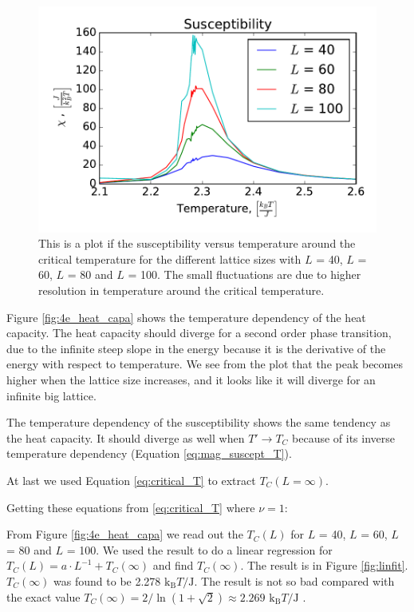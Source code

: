 \begin{figure}[H]
\includegraphics[width=\linewidth]{../results/4e/4e_x}\caption{This is a plot if the susceptibility versus temperature around the critical temperature for the different lattice sizes with $L$ = 40, $L$ = 60, $L$ = 80 and $L$ = 100. The small fluctuations are due to higher resolution in temperature around the critical temperature.}\label{fig:4e_suscept}
\end{figure}

Figure \ref{fig:4e_heat_capa} shows the temperature dependency of the heat capacity. The heat capacity should diverge for a second order phase transition, due to the infinite steep slope in the energy because it is the derivative of the energy with respect to temperature. We see from the plot that the peak becomes higher when the lattice size increases, and it looks like it will diverge for an infinite big lattice.

The temperature dependency of the susceptibility shows the same tendency as the heat capacity. It should diverge as well when $T' \rightarrow T_C$ because of its inverse temperature dependency (Equation \ref{eq:mag_suscept_T}).

At last we used Equation \ref{eq:critical_T} to extract $T_C (L = \infty)$.

Getting these equations from \ref{eq:critical_T} where $\nu = 1$:

From Figure \ref{fig:4e_heat_capa} we read out the $T_C(L)$ for $L$ = 40, $L$ = 60, $L$ = 80 and $L$ = 100. We used the result to do a linear regression for $T_C(L) = a\cdot L^{-1} + T_C(\infty)$ and find $T_C(\infty)$. The result is in Figure \ref{fig:linfit}. $T_C(\infty)$ was found to be 2.278 $\text{k}_\text{B}T/\text{J}$. The result is not so bad compared with the exact value $T_C(\infty) = 2/ \ln(1+\sqrt{
2}) \approx 2.269$ $\text{k}_\text{B}T/\text{J}$ \cite{Onsager}.

